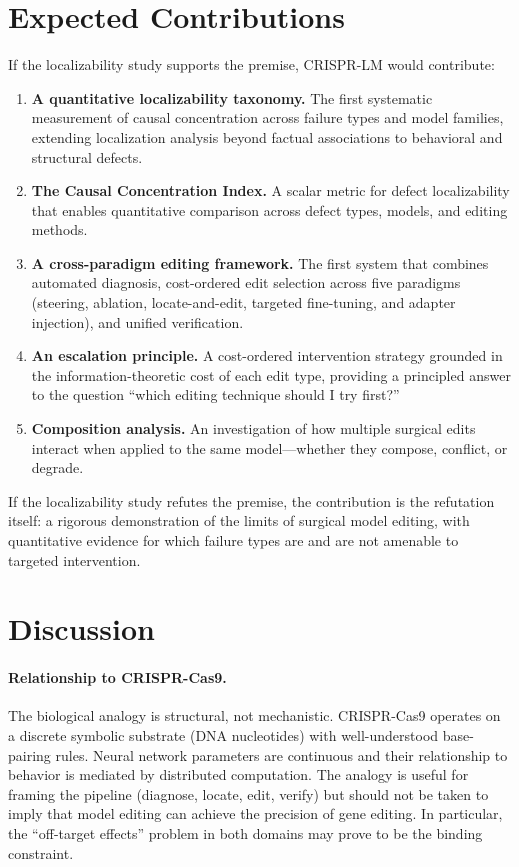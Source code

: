 \documentclass[11pt]{article}
\begin{document}
\section{Expected Contributions}

If the localizability study supports the premise, CRISPR-LM would contribute:

\begin{enumerate}[leftmargin=*]
  \item \textbf{A quantitative localizability taxonomy.} The first systematic measurement of causal concentration across failure types and model families, extending localization analysis beyond factual associations to behavioral and structural defects.
  \item \textbf{The Causal Concentration Index.} A scalar metric for defect localizability that enables quantitative comparison across defect types, models, and editing methods.
  \item \textbf{A cross-paradigm editing framework.} The first system that combines automated diagnosis, cost-ordered edit selection across five paradigms (steering, ablation, locate-and-edit, targeted fine-tuning, and adapter injection), and unified verification.
  \item \textbf{An escalation principle.} A cost-ordered intervention strategy grounded in the information-theoretic cost of each edit type, providing a principled answer to the question ``which editing technique should I try first?''
  \item \textbf{Composition analysis.} An investigation of how multiple surgical edits interact when applied to the same model---whether they compose, conflict, or degrade.
\end{enumerate}

If the localizability study refutes the premise, the contribution is the refutation itself: a rigorous demonstration of the limits of surgical model editing, with quantitative evidence for which failure types are and are not amenable to targeted intervention.

\section{Discussion}

\paragraph{Relationship to CRISPR-Cas9.} The biological analogy is structural, not mechanistic. CRISPR-Cas9 operates on a discrete symbolic substrate (DNA nucleotides) with well-understood base-pairing rules. Neural network parameters are continuous and their relationship to behavior is mediated by distributed computation. The analogy is useful for framing the pipeline (diagnose, locate, edit, verify) but should not be taken to imply that model editing can achieve the precision of gene editing. In particular, the ``off-target effects'' problem in both domains may prove to be the binding constraint.
\end{document}
